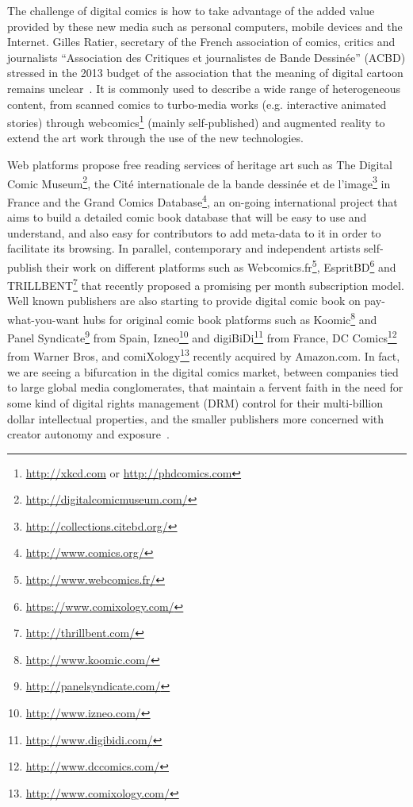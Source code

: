 The challenge of digital comics is how to take advantage of the added value provided by these new media such as personal computers, mobile devices and the Internet.
Gilles Ratier, secretary of the French association of comics, critics and journalists ``Association des Critiques et journalistes de Bande Dessin\'{e}e'' (ACBD) stressed in the 2013 budget of the association that the meaning of digital cartoon remains unclear~\cite{Ratier2013}.
It is commonly used to describe a wide range of heterogeneous content, from scanned comics to turbo-media works (e.g. interactive animated stories) through webcomics\footnote{\url{http://xkcd.com} or \url{http://phdcomics.com}} (mainly self-published) and augmented reality to extend the art work through the use of the new technologies.

Web platforms propose free reading services of heritage art such as The Digital Comic Museum\footnote{\url{http://digitalcomicmuseum.com/}}, the Cit\'{e} internationale de la bande dessin\'{e}e et de l'image\footnote{\url{http://collections.citebd.org/}} in France and the Grand Comics Database\footnote{\url{http://www.comics.org/}}, an on-going international project that aims to build a detailed comic book database that will be easy to use and understand, and also easy for contributors to add meta-data to it in order to facilitate its browsing.
In parallel, contemporary and independent artists self-publish their work on different platforms such as Webcomics.fr\footnote{\url{http://www.webcomics.fr/}}, EspritBD\footnote{\url{https://www.comixology.com/}} and TRILLBENT\footnote{\url{http://thrillbent.com/}} that recently proposed a promising per month subscription model.
Well known publishers are also starting to provide digital comic book on pay-what-you-want hubs for original comic book platforms such as Koomic\footnote{\url{http://www.koomic.com/}} and Panel Syndicate\footnote{\url{http://panelsyndicate.com/}} from Spain, Izneo\footnote{\url{http://www.izneo.com/}} and digiBiDi\footnote{\url{http://www.digibidi.com/}} from France, DC Comics\footnote{\url{http://www.dccomics.com/}} from Warner Bros, and comiXology\footnote{\url{http://www.comixology.com/}} recently acquired by Amazon.com.
In fact, we are seeing a bifurcation in the digital comics market, between companies tied to large global media conglomerates, that maintain a fervent faith in the need for some kind of digital rights management (DRM) control for their multi-billion dollar intellectual properties, and the smaller publishers more concerned with creator autonomy and exposure~\cite{publishersweekly2014Surveying}.

